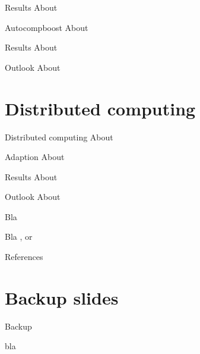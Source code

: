 \documentclass[10pt]{beamer}
\begin{document}
\begin{frame}{Results}
  About
\end{frame}


\begin{frame}{Autocompboost}
  About
\end{frame}

\begin{frame}{Results}
  About
\end{frame}

\begin{frame}{Outlook}
  About
\end{frame}


\section{Distributed computing}

\begin{frame}{Distributed computing}
  About
\end{frame}

\begin{frame}{Adaption}
  About
\end{frame}

\begin{frame}{Results}
  About
\end{frame}

\begin{frame}{Outlook}
  About
\end{frame}


\begin{frame}[allowframebreaks]{Bla}

  Bla
  \citep[see, e.g.,][]{Pepe2003}, or \cite{delong1988comparing}

\end{frame}

\appendix

\begin{frame}[allowframebreaks]{References}

\nocite{*}
\scriptsize


\end{frame}

\section{Backup slides}

\begin{frame}{Backup}

bla

\end{frame}
\end{document}
